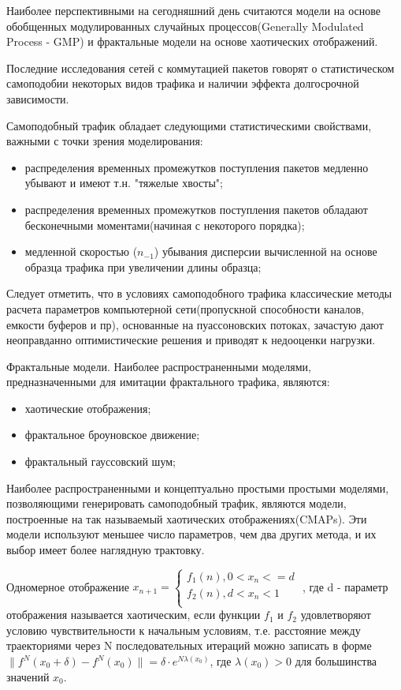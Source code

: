     Наиболее перспективными на сегодняшний день считаются модели на основе обобщенных модулированных случайных процессов(Generally Modulated Process - GMP) и фрактальные модели на основе хаотических отображений.

    Последние исследования сетей с коммутацией пакетов говорят о статистическом самоподобии некоторых видов трафика и наличии эффекта долгосрочной зависимости.

    Самоподобный трафик обладает следующими статистическими свойствами, важными с точки зрения моделирования:
    \begin{itemize}
        \item распределения временных промежутков поступления пакетов медленно убывают и имеют т.н. "тяжелые хвосты";
        \item распределения временных промежутков поступления пакетов обладают бесконечными моментами(начиная с некоторого порядка);
        \item медленной скоростью ($n_{-1}$) убывания дисперсии вычисленной на основе образца трафика при увеличении длины образца;
    \end{itemize}

    Следует отметить, что в условиях самоподобного трафика классические методы расчета параметров компьютерной сети(пропускной способности каналов, емкости буферов и пр), основанные на пуассоновских потоках, зачастую дают неоправданно оптимистические решения и приводят к недооценки нагрузки.

    Фрактальные модели. Наиболее распространенными моделями, предназначенными для имитации фрактального трафика, являются:

    \begin{itemize}
        \item хаотические отображения;
        \item фрактальное броуновское движение;
        \item фрактальный гауссовский шум;
    \end{itemize}

    Наиболее распространенными и концептуально простыми простыми моделями, позволяющими генерировать самоподобный трафик, являются модели, построенные на так называемый хаотических отображениях(CMAPs). Эти модели используют меньшее число параметров, чем два других метода, и их выбор имеет более наглядную трактовку.

    Одномерное отображение $
        x_{n+1} = \left\{
                    \begin{aligned}
                        f_{1}(n), 0 < x_{n} <= d \\
                        f_{2}(n), d < x_{n} < 1 \\
                    \end{aligned}
                  \right. $
    , где d - параметр отображения называется хаотическим, если функции $f_{1}$ и $f_{2}$ удовлетворяют условию чувствительности к начальным условиям, т.е. расстояние между траекториями через N последовательных итераций можно записать в форме $\|f^{N}(x_{0} + \delta) - f^{N}(x_{0})\| = \delta \cdot e^{N\lambda(x_{0})}$, где $\lambda(x_{0}) > 0$ для большинства значений $x_{0}$.

